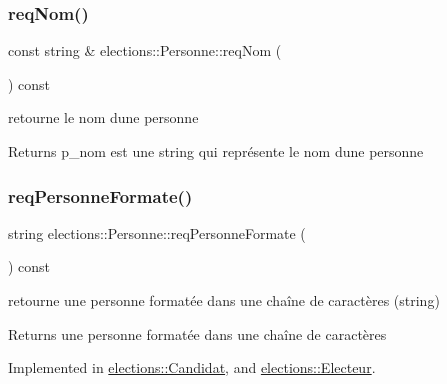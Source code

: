 \subsubsection{\texorpdfstring{req\+Nom()}{reqNom()}}
{\footnotesize\ttfamily const string \& elections\+::\+Personne\+::req\+Nom (\begin{DoxyParamCaption}{ }\end{DoxyParamCaption}) const}



retourne le nom d\textquotesingle{}une personne 

\begin{DoxyReturn}{Returns}
p\+\_\+nom est une string qui représente le nom d\textquotesingle{}une personne 
\end{DoxyReturn}
\mbox{\label{classelections_1_1Personne_aac1232e61b7cb9743bafba9280041d35}} 
\subsubsection{\texorpdfstring{req\+Personne\+Formate()}{reqPersonneFormate()}}
{\footnotesize\ttfamily string elections\+::\+Personne\+::req\+Personne\+Formate (\begin{DoxyParamCaption}{ }\end{DoxyParamCaption}) const\hspace{0.3cm}{\ttfamily [pure virtual]}}



retourne une personne formatée dans une chaîne de caractères (string) 

\begin{DoxyReturn}{Returns}
une personne formatée dans une chaîne de caractères 
\end{DoxyReturn}


Implemented in \hyperlink{classelections_1_1Candidat_a4b614df7326d8aacdec158b77a6ec406}{elections\+::\+Candidat}, and \hyperlink{classelections_1_1Electeur_ac233f4fb12d9267374c8e66864d89689}{elections\+::\+Electeur}.

\mbox{\label{classelections_1_1Personne_a308b2c6b55cf3d0f414ba5c19873169f}} 
